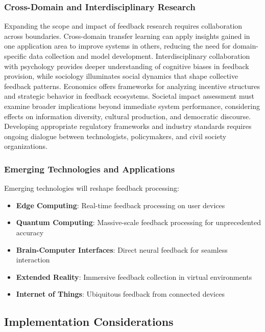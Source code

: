 \subsubsection{Cross-Domain and Interdisciplinary Research}

Expanding the scope and impact of feedback research requires collaboration across boundaries. Cross-domain transfer learning can apply insights gained in one application area to improve systems in others, reducing the need for domain-specific data collection and model development. Interdisciplinary collaboration with psychology provides deeper understanding of cognitive biases in feedback provision, while sociology illuminates social dynamics that shape collective feedback patterns. Economics offers frameworks for analyzing incentive structures and strategic behavior in feedback ecosystems. Societal impact assessment must examine broader implications beyond immediate system performance, considering effects on information diversity, cultural production, and democratic discourse. Developing appropriate regulatory frameworks and industry standards requires ongoing dialogue between technologists, policymakers, and civil society organizations.

\subsubsection{Emerging Technologies and Applications}

Emerging technologies will reshape feedback processing:

\begin{itemize}
    \item \textbf{Edge Computing}: Real-time feedback processing on user devices
    \item \textbf{Quantum Computing}: Massive-scale feedback processing for unprecedented accuracy
    \item \textbf{Brain-Computer Interfaces}: Direct neural feedback for seamless interaction
    \item \textbf{Extended Reality}: Immersive feedback collection in virtual environments
    \item \textbf{Internet of Things}: Ubiquitous feedback from connected devices
\end{itemize}

\subsection{Implementation Considerations}

